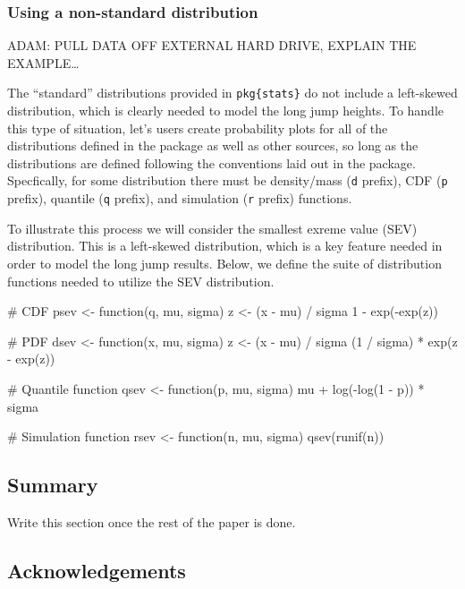\subsubsection{Using a non-standard
distribution}\label{using-a-non-standard-distribution}

ADAM: PULL DATA OFF EXTERNAL HARD DRIVE, EXPLAIN THE EXAMPLE\ldots{}

The ``standard'' distributions provided in \texttt{pkg\{stats\}} do not
include a left-skewed distribution, which is clearly needed to model the
long jump heights. To handle this type of situation,  let's
users create probability plots for all of the distributions defined in
the  package as well as other sources, so long as the
distributions are defined following the conventions laid out in the
 package. Specfically, for some distribution there must be
density/mass (\texttt{d} prefix), CDF (\texttt{p} prefix), quantile
(\texttt{q} prefix), and simulation (\texttt{r} prefix) functions.

To illustrate this process we will consider the smallest exreme value
(SEV) distribution. This is a left-skewed distribution, which is a key
feature needed in order to model the long jump results. Below, we define
the suite of distribution functions needed to utilize the SEV
distribution.

\begin{Schunk}
\begin{Sinput}
# CDF
psev <- function(q, mu, sigma) {
    z <- (x - mu) / sigma
    1 - exp(-exp(z))
}

# PDF
dsev <- function(x, mu, sigma) {
  z <- (x - mu) / sigma
  (1 / sigma) * exp(z - exp(z))
}

# Quantile function
qsev <- function(p, mu, sigma) {
  mu + log(-log(1 - p)) * sigma
}

# Simulation function
rsev <- function(n, mu, sigma) {
  qsev(runif(n))
}
\end{Sinput}
\end{Schunk}

\subsection{Summary}\label{summary}

Write this section once the rest of the paper is done.



\subsection{Acknowledgements}\label{acknowledgements}

